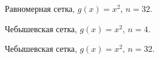 \documentclass[12pt, a4paper]{article}
\begin{document}
\begin{figure}[h]
    \caption{Равномерная сетка, $g(x) = x^2$, $n = 32$.}
\end{figure}

\pagebreak


\begin{figure}[h]
    \caption{Чебышевская сетка, $g(x) = x^2$, $n = 4$.}
\end{figure}

\begin{figure}[h]
    \caption{Чебышевская сетка, $g(x) = x^2$, $n = 32$.}
\end{figure}
\end{document}

